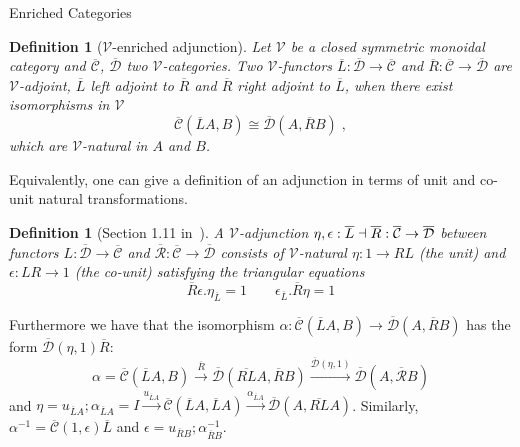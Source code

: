 \documentclass[acmsmall, screen, nonacm]{acmart}
\newtheorem{definition}[theorem]{Definition}
\newcommand\enriched[1]{{\overline{\mathcal{#1}}}}
\begin{document}
\begin{section}{Enriched Categories}
\begin{definition}[$\mathcal{V}$-enriched adjunction]
  Let $\mathcal{V}$ be a closed symmetric monoidal category and $\enriched{C}$, $\enriched{D}$ two $\mathcal{V}$-categories.
  Two $\mathcal{V}$-functors $\overline{L} : \enriched{D} \to \enriched{C}$ and $\overline{R} : \enriched{C} \to \enriched{D}$ are $\mathcal{V}$-adjoint, $\overline{L}$ left adjoint to $\overline{R}$ and $\overline{R}$ right adjoint to $\overline{L}$, when there exist isomorphisms in $\mathcal{V}$
  \[
  \enriched{C}(\overline{L}A,B) \cong \enriched{D}(A, \overline{R}B) \;,
  \]
  which are $\mathcal{V}$-natural in $A$ and $B$.
\end{definition}

Equivalently, one can give a definition of an adjunction in terms of unit and co-unit natural transformations.

\begin{definition}[Section 1.11 in~\cite{Kelly2022BASICCO}]
  A $\mathcal{V}$-adjunction $\eta, \epsilon: \overline{L} \;\reflectbox{$\vdash$}\; \overline{R} : \enriched{C} \to \enriched{D}$ between functors $L : \enriched{D} \to \enriched{C}$ and $\enriched{R} : \enriched{C} \to \enriched{D}$ consists of $\mathcal{V}$-natural $\eta : 1 \to RL$ (the \textit{unit}) and $\epsilon : LR \to 1$ (the \textit{co-unit}) satisfying the triangular equations
  \[
  \overline{R}\epsilon . \eta_{\overline{L}} = 1 \qquad \epsilon_{\overline{L}} . \overline{R} \eta = 1
  \]
\end{definition}
Furthermore we have that the isomorphism $\alpha : \enriched{C}(\overline{L}A,B) \to \enriched{D}(A, \overline{R}B)$ has the form $\enriched{D}(\eta, 1)\overline{R}$:
\[
  \alpha = \enriched{C}(\overline{L}A, B) \xrightarrow{\overline{R}} \enriched{D}(\overline{RL}A, \overline{R}B) \xrightarrow{\enriched{D}(\eta, 1)} \enriched{D}(A, \enriched{R}B)
\]
and $\eta = u_{\overline{L}A};\alpha_{\overline{L}A} = I \xrightarrow{u_{\overline{L}A}}\enriched{C}(\overline{L}A, \overline{L}A) \xrightarrow{\alpha_{\overline{L}A}} \enriched{D}(A,\overline{RL}A)$.
Similarly, $\alpha^{-1} = \enriched{C}(1,\epsilon)\overline{L}$ and $\epsilon = u_{\overline{R}B};\alpha^{-1}_{\overline{R}B}$.


\end{section}
\end{document}
